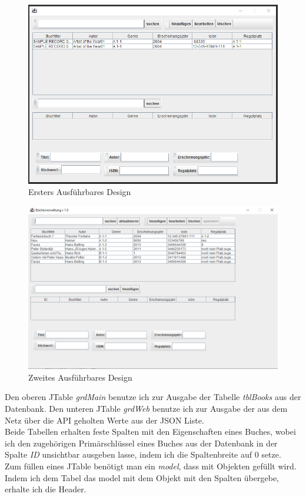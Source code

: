 \begin{figure}[h]
\begin{center}
\includegraphics[width=15cm]{img/alpha.png}
\caption{Ersters Ausführbares Design}
\label{alpha}
\end{center}
\end{figure}



\begin{figure}[h]
\begin{center}
\includegraphics[width=15cm]{img/beta.png}
\caption{Zweites Ausführbares Design}
\label{beta}
\end{center}
\end{figure}

\newpage

Den oberen JTable \textit{grdMain} benutze ich zur Ausgabe der Tabelle \textit{tblBooks} aus der Datenbank. Den unteren JTable \textit{grdWeb} benutze ich zur Ausgabe der aus dem Netz über die API geholten Werte aus der JSON Liste.\\
Beide Tabellen erhalten feste Spalten mit den Eigenschaften eines Buches, wobei ich den zugehörigen Primärschlüssel eines Buches aus der Datenbank in der Spalte \textit{ID} unsichtbar ausgeben lasse, indem ich die Spaltenbreite auf 0 setze.\\
Zum füllen eines JTable benötigt man ein \textit{model}, dass mit Objekten gefüllt wird.
Indem ich dem Tabel das model mit dem Objekt mit den Spalten übergebe, erhalte ich die Header.\\

